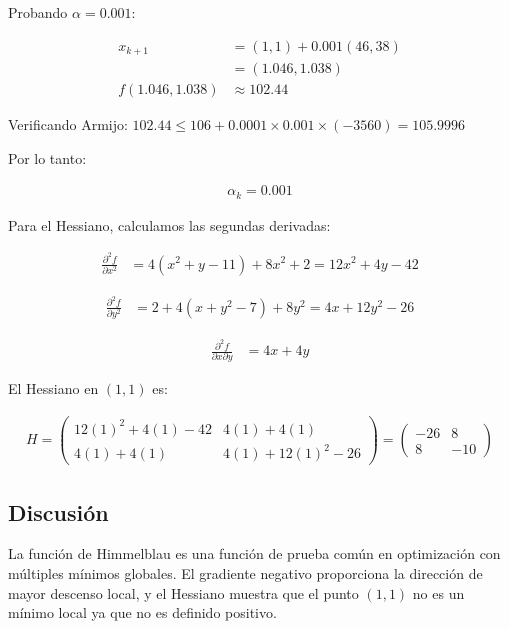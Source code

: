 \documentclass{article}
\begin{document}
Probando $\alpha = 0.001$:

\begin{align}
    x_{k+1} &= (1,1) + 0.001(46, 38) \\
    &= (1.046, 1.038)\\
    f(1.046, 1.038) &\approx 102.44
\end{align}

Verificando Armijo: $102.44 \leq 106 + 0.0001 \times 0.001 \times (-3560) = 105.9996$

Por lo tanto:

\begin{align}
    \alpha_k = 0.001
\end{align}

Para el Hessiano, calculamos las segundas derivadas:

\begin{align}
    \frac{\partial^2 f}{\partial x^2} &= 4(x^2+y-11) + 8x^2 + 2 = 12x^2 + 4y - 42
\end{align}

\begin{align}
    \frac{\partial^2 f}{\partial y^2} &= 2 + 4(x+y^2-7) + 8y^2 = 4x + 12y^2 - 26
\end{align}

\begin{align}
    \frac{\partial^2 f}{\partial x \partial y} &= 4x + 4y
\end{align}

El Hessiano en $(1,1)$ es:

\begin{align}
    H = \begin{pmatrix}
        12(1)^2 + 4(1) - 42 & 4(1) + 4(1) \\
        4(1) + 4(1) & 4(1) + 12(1)^2 - 26
    \end{pmatrix} = \begin{pmatrix}
        -26 & 8 \\
        8 & -10
    \end{pmatrix}
\end{align}

\subsection{Discusión}

La función de Himmelblau es una función de prueba común en optimización con múltiples mínimos globales. El gradiente negativo proporciona la dirección de mayor descenso local, y el Hessiano muestra que el punto $(1,1)$ no es un mínimo local ya que no es definido positivo.
\end{document}
